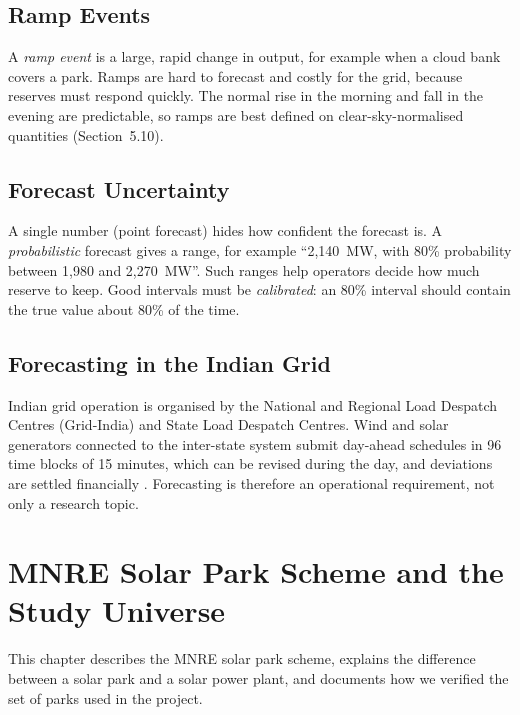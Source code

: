 \documentclass[12pt]{report}
\begin{document}
\section{Ramp Events}
\vspace{1mm}
A \textit{ramp event} is a large, rapid change in output, for example when a cloud bank covers a park. Ramps are hard to forecast and costly for the grid, because reserves must respond quickly. The normal rise in the morning and fall in the evening are predictable, so ramps are best defined on clear-sky-normalised quantities (Section~5.10).

\section{Forecast Uncertainty}
\vspace{1mm}
A single number (point forecast) hides how confident the forecast is. A \textit{probabilistic} forecast gives a range, for example ``2,140~MW, with 80\% probability between 1,980 and 2,270~MW''. Such ranges help operators decide how much reserve to keep. Good intervals must be \textit{calibrated}: an 80\% interval should contain the true value about 80\% of the time.

\section{Forecasting in the Indian Grid}
\vspace{1mm}
Indian grid operation is organised by the National and Regional Load Despatch Centres (Grid-India) and State Load Despatch Centres. Wind and solar generators connected to the inter-state system submit day-ahead schedules in 96 time blocks of 15 minutes, which can be revised during the day, and deviations are settled financially \cite{cerc2015}. Forecasting is therefore an operational requirement, not only a research topic.

\chapter{MNRE Solar Park Scheme and the Study Universe}
This chapter describes the MNRE solar park scheme, explains the difference between a solar park and a solar power plant, and documents how we verified the set of parks used in the project.
\end{document}
